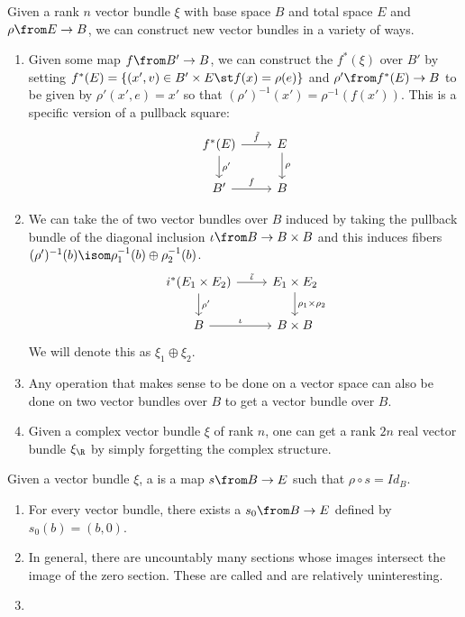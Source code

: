 \documentclass[11pt,leqno,oneside]{amsbook}
\numberwithin{thm}{section}
\begin{document}
\begin{prop}\label{new-bundles-from-old}
  Given a rank \(n\) vector bundle \(\xi\) with base space \(B\) and
  total space 
  \(E\) and \(\rho \from E \to B\), we can construct new vector
  bundles  
  in a variety of ways.
  \begin{enumerate}
  \item Given some map \(f \from B' \to B\), we can construct the
     \(f^*(\xi)\) over \(B'\) by setting \(f^*(E)
    = \{(x',v) \in B' \times E \st f(x) = \rho(e)\}\) and \(\rho'
    \from f^*(E) \to B\) to be given by \(\rho'(x',e) = x'\) so that
    \((\rho')^{-1}(x') = \rho^{-1}(f(x'))\). This is a
    specific version of a pullback square: 
    \[
      \begin{tikzcd}
        f^*(E) \ar[d,"\rho'"] \ar[r,"\tilde{f}"] & E \ar[d,"\rho"]\\
        B' \ar[r, "f"] & B
      \end{tikzcd}
    \]

  \item We can take the  of two vector bundles over
    \(B\) induced by taking the pullback bundle of the diagonal
    inclusion \(\iota \from B \to B \times B\) and this induces fibers
    \((\rho')^{-1}(b) \isom \rho_1^{-1}(b) \oplus \rho_2^{-1}(b)\).
    \[
      \begin{tikzcd}
       i^*(E_1 \times E_2) \ar[d,"\rho' "] \ar[r,"\tilde{\iota}"]& E_1
       \times E_2 \ar[d,"\rho_1 
       \times \rho_2"]\\ 
       B \ar[r, "\iota"] & B \times B
      \end{tikzcd}
    \]
    We will denote this as \(\xi_1 \oplus \xi_2\).
  \item Any operation that makes sense to be done on a vector space
    can also be done on two vector bundles over \(B\) to get a vector
    bundle over \(B\). 
  \item Given a complex vector bundle \(\xi\) of rank \(n\), one can
    get a rank \(2n\) 
    real vector bundle \(\xi_\R\) by simply forgetting the complex
    structure. 
  \end{enumerate}
\end{prop}
\begin{defn}
  Given a vector bundle \(\xi\), a  is a map \(s \from B
  \to E\) such that \(\rho \circ s = Id_B\).
\end{defn}
\begin{example}
  \begin{enumerate}
  \item For every vector bundle, there exists a 
    \(s_0 \from B \to E\) defined by \(s_0(b) = (b,0)\).
  \item In general, there are uncountably many sections whose images
    intersect 
    the image of the zero section. These are called  and are relatively uninteresting.
  \item {}
  \end{enumerate}
\end{example}
\end{document}
